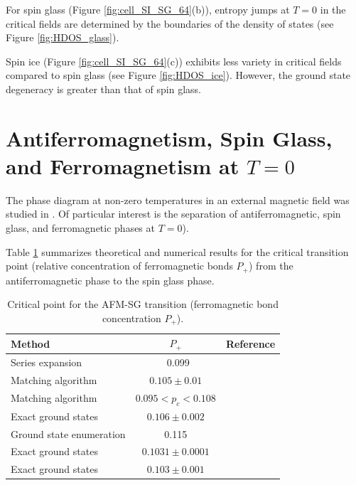 \documentclass[utf8, babel, sor, jor, amsmath, amssymb, reprint]{elsarticle} %
\begin{document}
For spin glass (Figure \ref{fig:cell_SI_SG_64}(b)), entropy jumps at $T=0$ in the critical fields are determined by the boundaries of the density of states (see Figure \ref{fig:HDOS_glass}).


Spin ice (Figure \ref{fig:cell_SI_SG_64}(c)) exhibits less variety in critical fields compared to spin glass (see Figure \ref{fig:HDOS_ice}). However, the ground state degeneracy is greater than that of spin glass.


\section{Antiferromagnetism, Spin Glass, and Ferromagnetism at $T = 0$}

The phase diagram at non-zero temperatures in an external magnetic field was studied in \cite{trukhin4855337thermodynamic}. Of particular interest is the separation of antiferromagnetic, spin glass, and ferromagnetic phases at $T = 0$).

Table \ref{tab:lit_phase} summarizes theoretical and numerical results for the critical transition point (relative concentration of ferromagnetic bonds $P_+$) from the antiferromagnetic phase to the spin glass phase.

\begin{table}[!h]
	\centering
	\begin{tabular}{|l|c|l|}
		\hline
		Method & \( P_{+} \) & Reference \\ \hline
		Series expansion & ~0.099 & \cite{PhysRevB.19.260} \\ \hline
		Matching algorithm & \( 0.105 \pm 0.01 \) & \cite{H_Freund_1989} \\ \hline
		Matching algorithm & \( 0.095 < p_c < 0.108 \) & \cite{BENDISCH1994139} \\ \hline
		Exact ground states & \( 0.106 \pm 0.002 \) & \cite{N.Kawashima_1997} \\ \hline
		Ground state enumeration & 0.115 & \cite{PhysRevE.58.1502} \\ \hline
		Exact ground states & \( 0.1031 \pm 0.0001 \) & \cite{WANG200331} \\ \hline
		Exact ground states & \( 0.103 \pm 0.001 \) & \cite{amoruso2004domain} \\ \hline
	\end{tabular}
	\caption{Critical point for the AFM-SG transition (ferromagnetic bond concentration \( P_+ \)).}
	\label{tab:lit_phase}
\end{table}
\end{document}
